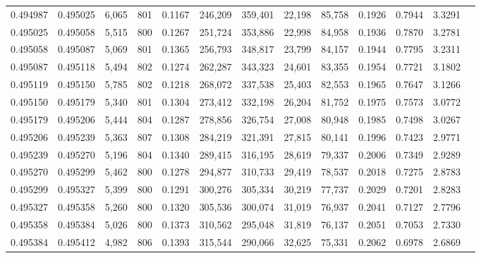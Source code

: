 \begin{tabular}{rrrrrrrrrrrrr}
0.494987 & 0.495025 &  6,065 & 801 &                                     0.1167 & 246,209 & 359,401 &  22,198 &  85,758 & 0.1926 & 0.7944 & 3.3291 \\
0.495025 & 0.495058 &  5,515 & 800 &                                     0.1267 & 251,724 & 353,886 &  22,998 &  84,958 & 0.1936 & 0.7870 & 3.2781 \\
0.495058 & 0.495087 &  5,069 & 801 &                                     0.1365 & 256,793 & 348,817 &  23,799 &  84,157 & 0.1944 & 0.7795 & 3.2311 \\
0.495087 & 0.495118 &  5,494 & 802 &                                     0.1274 & 262,287 & 343,323 &  24,601 &  83,355 & 0.1954 & 0.7721 & 3.1802 \\
0.495119 & 0.495150 &  5,785 & 802 &                                     0.1218 & 268,072 & 337,538 &  25,403 &  82,553 & 0.1965 & 0.7647 & 3.1266 \\
0.495150 & 0.495179 &  5,340 & 801 &                                     0.1304 & 273,412 & 332,198 &  26,204 &  81,752 & 0.1975 & 0.7573 & 3.0772 \\
0.495179 & 0.495206 &  5,444 & 804 &                                     0.1287 & 278,856 & 326,754 &  27,008 &  80,948 & 0.1985 & 0.7498 & 3.0267 \\
0.495206 & 0.495239 &  5,363 & 807 &                                     0.1308 & 284,219 & 321,391 &  27,815 &  80,141 & 0.1996 & 0.7423 & 2.9771 \\
0.495239 & 0.495270 &  5,196 & 804 &                                     0.1340 & 289,415 & 316,195 &  28,619 &  79,337 & 0.2006 & 0.7349 & 2.9289 \\
0.495270 & 0.495299 &  5,462 & 800 &                                     0.1278 & 294,877 & 310,733 &  29,419 &  78,537 & 0.2018 & 0.7275 & 2.8783 \\
0.495299 & 0.495327 &  5,399 & 800 &                                     0.1291 & 300,276 & 305,334 &  30,219 &  77,737 & 0.2029 & 0.7201 & 2.8283 \\
0.495327 & 0.495358 &  5,260 & 800 &                                     0.1320 & 305,536 & 300,074 &  31,019 &  76,937 & 0.2041 & 0.7127 & 2.7796 \\
0.495358 & 0.495384 &  5,026 & 800 &                                     0.1373 & 310,562 & 295,048 &  31,819 &  76,137 & 0.2051 & 0.7053 & 2.7330 \\
0.495384 & 0.495412 &  4,982 & 806 &                                     0.1393 & 315,544 & 290,066 &  32,625 &  75,331 & 0.2062 & 0.6978 & 2.6869 \\

\end{tabular}
